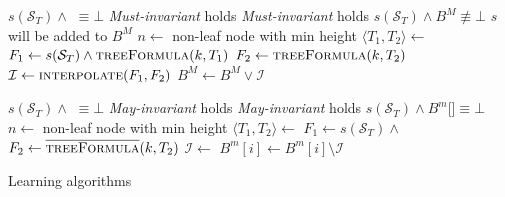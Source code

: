 \begin{algorithm}
    \begin{algorithmic}[1]
        \Require $s(\mathcal{S}_T) \land $  $\equiv \bot$
        \Require \emph{Must-invariant} holds
        \Ensure \emph{Must-invariant} holds
        \Ensure $s(\mathcal{S}_T) \land B^M \not\equiv \bot$
        \Comment $s$ will be added to $B^M$
                \Return
            \EndIIf
            \State $n \gets $ non-leaf node with min height 
            \State $\langle T_1, T_2 \rangle \gets $ 
            \State $F_1 \gets s(\mathcal{S}_T) \land \Call{treeFormula}{k, T_1}$
            \State $F_2 \gets \Call{treeFormula}{k, T_2}$
            \State $\mathcal{I} \gets  \Call{interpolate}{F_1, F_2}$
            \State $B^M \gets B^M \lor \mathcal{I}$
            \State {}
        \EndFunction
    \end{algorithmic}
    
    \begin{algorithmic}[1]
        \Require $s(\mathcal{S}_T) \land $  $\equiv \bot$
        \Require \emph{May-invariant} holds
        \Ensure \emph{May-invariant} holds
        \Ensure $s(\mathcal{S}_T) \land B^m[$$] \equiv \bot$
                \Return
            \EndIIf
            \State $n \gets $ non-leaf node with min height 
            \State $\langle T_1, T_2 \rangle \gets $ 
            \State $F_1 \gets s(\mathcal{S}_T) \land $ 
            \State $F_2 \gets \Call{\textoverline{treeFormula}}{k, T_2}$
            \State $\mathcal{I} \gets $ 
                \State $B^m[i] \gets B^m[i] \setminus \mathcal{I}$
            \EndFor
            \State {}
        \EndFunction
    \end{algorithmic}
    \caption{Learning algorithms}
    \label{alg:learn}
\end{algorithm}


